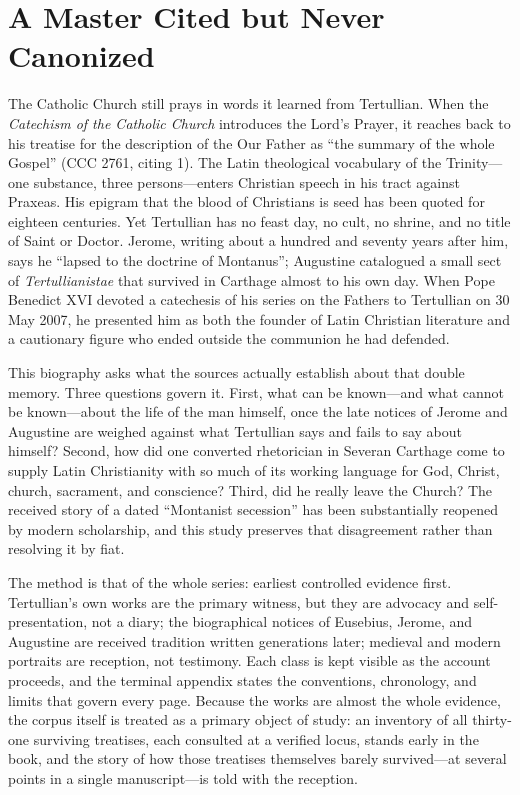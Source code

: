 \section{A Master Cited but Never Canonized}

The Catholic Church still prays in words it learned from Tertullian. When the
\textit{Catechism of the Catholic Church} introduces the Lord's Prayer, it
reaches back to his treatise  for the description of the Our
Father as ``the summary of the whole Gospel'' (CCC 2761, citing  1). The Latin theological vocabulary of the Trinity---one substance,
three persons---enters Christian speech in his tract against Praxeas. His
epigram that the blood of Christians is seed has been quoted for eighteen
centuries. Yet Tertullian has no feast day, no cult, no shrine, and no title of
Saint or Doctor. Jerome, writing about a hundred and seventy years after him,
says he ``lapsed to the doctrine of Montanus''; Augustine catalogued a small
sect of \textit{Tertullianistae} that survived in Carthage almost to his own
day. When Pope Benedict XVI devoted a catechesis of his series on the Fathers
to Tertullian on 30 May 2007, he presented him as both the founder of Latin
Christian literature and a cautionary figure who ended outside the communion he
had defended.

This biography asks what the sources actually establish about that double
memory. Three questions govern it. First, what can be known---and what cannot
be known---about the life of the man himself, once the late notices of Jerome
and Augustine are weighed against what Tertullian says and fails to say about
himself? Second, how did one converted rhetorician in Severan Carthage come to
supply Latin Christianity with so much of its working language for God, Christ,
church, sacrament, and conscience? Third, did he really leave the Church? The
received story of a dated ``Montanist secession'' has been substantially
reopened by modern scholarship, and this study preserves that disagreement
rather than resolving it by fiat.

The method is that of the whole series: earliest controlled evidence first.
Tertullian's own works are the primary witness, but they are advocacy and
self-presentation, not a diary; the biographical notices of Eusebius, Jerome,
and Augustine are received tradition written generations later; medieval and
modern portraits are reception, not testimony. Each class is kept visible as
the account proceeds, and the terminal appendix states the conventions,
chronology, and limits that govern every page. Because the works are almost
the whole evidence, the corpus itself is treated as a primary object of
study: an inventory of all thirty-one surviving treatises, each consulted at
a verified locus, stands early in the book, and the story of how those
treatises themselves barely survived---at several points in a single
manuscript---is told with the reception.
